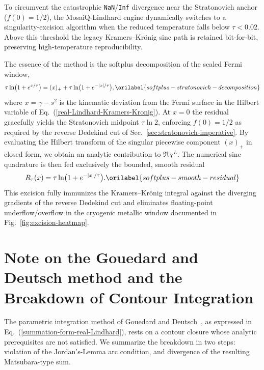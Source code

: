 \documentclass[aps,showkeys,noshowpacs,superscriptaddress,pre,preprint]{revtex4-2}
\let\label\orilabel
\begin{document}
To circumvent the catastrophic \texttt{NaN}/\texttt{Inf} divergence near the Stratonovich anchor ($f(0)=1/2$), the MosaiQ-Lindhard engine dynamically switches to a singularity-excision algorithm when the reduced temperature falls below $\tau < 0.02$.
Above this threshold the legacy Kramers--Kr\"onig sinc path is retained bit-for-bit, preserving high-temperature reproducibility.

The essence of the method is the softplus decomposition of the scaled Fermi window,
\begin{equation}
\tau \ln\bigl(1 + e^{x/\tau}\bigr)
= (x)_+
+ \tau \ln\bigl(1 + e^{-|x|/\tau}\bigr) ,
\label{softplus-stratonovich-decomposition}
\end{equation}
where $x = \gamma - s^2$ is the kinematic deviation from the Fermi surface in the Hilbert variable of Eq.~(\ref{real-Lindhard-Kramers-Kronig}).
At $x=0$ the residual gracefully yields the Stratonovich midpoint $\tau \ln 2$, enforcing $f(0)=1/2$ as required by the reverse Dedekind cut of Sec.~\ref{sec:stratonovich-imperative}.
By evaluating the Hilbert transform of the singular piecewise component $(x)_+$ in closed form, we obtain an analytic contribution to $\Re\chi^L$.
The numerical sinc quadrature is then fed exclusively the bounded, smooth residual
\begin{equation}
R_\tau(x) = \tau \ln\bigl(1 + e^{-|x|/\tau}\bigr) .
\label{softplus-smooth-residual}
\end{equation}
This excision fully immunizes the Kramers--Kr\"onig integral against the diverging gradients of the reverse Dedekind cut and eliminates floating-point underflow/overflow in the cryogenic metallic window documented in Fig.~\ref{fig:excision-heatmap}.

\section{Note on the Gouedard and Deutsch method and the Breakdown of Contour Integration}
\label{sec:Gouedard-Deutsch}

The parametric integration method of Gouedard and Deutsch~\cite{Gouedard-Deutsch1978},
as expressed in Eq.~(\ref{summation-form-real-Lindhard}),
rests on a contour closure whose analytic prerequisites are not satisfied.
We summarize the breakdown in two steps: violation of the Jordan's-Lemma arc condition,
and divergence of the resulting Matsubara-type sum.
\end{document}
